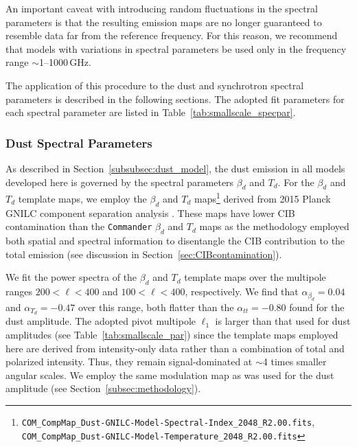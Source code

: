 \documentclass[twocolumn]{aastex631}
\begin{document}
An important caveat with introducing random fluctuations in the spectral parameters is that the resulting emission maps are no longer guaranteed to resemble data far from the reference frequency. For this reason, we recommend that models with variations in spectral parameters be used only in the frequency range $\sim$1--1000\,GHz.

The application of this procedure to the dust and synchrotron spectral parameters is described in the following sections. The adopted fit parameters for each spectral parameter are listed in Table~\ref{tab:smallscale_specpar}.

\subsubsection{Dust Spectral Parameters}\label{subsec:dust_spec_params}
As described in Section~\ref{subsubsec:dust_model}, the dust emission in all models developed here is governed by the spectral parameters $\beta_d$ and $T_d$. For the $\beta_d$ and $T_d$ template maps, we employ the $\beta_d$ and $T_d$ maps\footnote{\texttt{COM\_CompMap\_Dust-GNILC-Model-Spectral-Index\_2048\_R2.00.fits}, \texttt{COM\_CompMap\_Dust-GNILC-Model-Temperature\_2048\_R2.00.fits}} derived from 2015 Planck GNILC component separation analysis \citep{planck2016-XLVIII}. These maps have lower CIB contamination than the \texttt{Commander} $\beta_d$ and $T_d$ maps \citep{planck2014-a12} as the methodology employed both spatial and spectral information to disentangle the CIB contribution to the total emission (see discussion in Section~\ref{sec:CIBcontamination}).

We fit the power spectra of the $\beta_d$ and $T_d$ template maps over the multipole ranges $200 < \ell < 400$ and $100 < \ell < 400$, respectively. We find that $\alpha_{\beta_d}= 0.04$ and $\alpha_{T_d} = -0.47$ over this range, both flatter than the $\alpha_{tt} = -0.80$ found for the dust amplitude. The adopted pivot multipole $\ell_1$ is larger than that used for dust amplitudes (see Table~\ref{tab:smallscale_par}) since the template maps employed here are derived from intensity-only data rather than a combination of total and polarized intensity. Thus, they remain signal-dominated at $\sim$4 times smaller angular scales. We employ the same modulation map as was used for the dust amplitude (see Section~\ref{subsec:methodology}).
\end{document}
